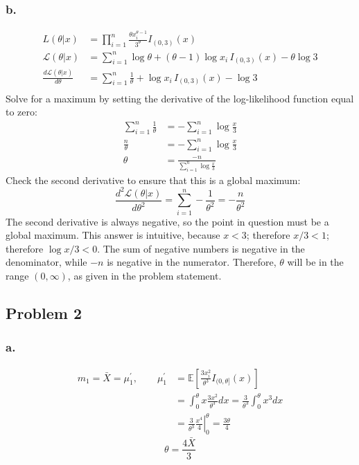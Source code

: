 \documentclass{article}
\begin{document}
\subsubsection*{b.}
\begin{align*}
L(\theta|x)&=\prod_{i=1}^n\frac{\theta x_i^{\theta-1}}{3^\theta}I_{(0,3)}(x) \\
\mathcal{L}(\theta|x)&=\sum_{i=1}^n \log{\theta}+(\theta-1)\log{x_i}\,I_{(0,3)}(x)-\theta\log{3} \\
\frac{d\mathcal{L}(\theta|x)}{d\theta} &= \sum_{i=1}^n \frac{1}{\theta} + \log{x_i}\,I_{(0,3)}(x) - \log{3} \\
\end{align*}
Solve for a maximum by setting the derivative of the log-likelihood function equal to zero:
\begin{align*}
\sum_{i=1}^n \frac{1}{\theta} &= -\sum_{i=1}^{n}\log{\frac{x}{3}} \\
\frac{n}{\theta} &= -\sum_{i=1}^{n}\log{\frac{x}{3}} \\
\theta &= \frac{-n}{\sum_{i=1}^{n}\log{\frac{x}{3}}}
\end{align*}
Check the second derivative to ensure that this is a global maximum:
\[\frac{d^2\mathcal{L}(\theta|x)}{d\theta^2} = \sum_{i=1}^n -\frac{1}{\theta^2} = -\frac{n}{\theta^2}\]
The second derivative is always negative, so the point in question must be a global maximum. This answer is intuitive, because $x<3$; therefore $x/3 < 1$; therefore $\log{x/3}<0$. The sum of negative numbers is negative in the denominator, while $-n$ is negative in the numerator. Therefore, $\theta$ will be in the range $(0,\infty)$, as given in the problem statement.

\subsection*{Problem 2}
\subsubsection*{a.}
\begin{align*}
m_1 = \bar{X}= \mu_1^\prime,\quad\quad\mu_1^\prime &= \mathbb{E}\left[\frac{3x_i^2}{\theta^3}I_{(0,\theta]}(x)\right] \\
&=\int_0^\theta x\frac{3x^2}{\theta^3}dx = \frac{3}{\theta^3}\int^\theta_0x^3dx \\
&=\frac{3}{\theta^3}\left.\frac{x^4}{4}\right|^\theta_0 = \frac{3\theta}{4}
\end{align*}
\[\theta = \frac{4\bar{X}}{3}\]
\end{document}
